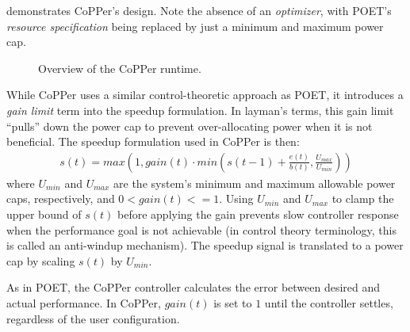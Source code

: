  demonstrates CoPPer's design.
Note the absence of an \emph{optimizer}, with POET's \emph{resource specification} being replaced by just a minimum and maximum power cap.

\begin{figure}[t]
  \begin{centering}
    
    \caption{Overview of the CoPPer runtime.}
    \label{fig:copper-runtime}
  \end{centering}
\end{figure}

While CoPPer uses a similar control-theoretic approach as POET, it introduces a \emph{gain limit} term into the speedup formulation.
In layman's terms, this gain limit ``pulls'' down the power cap to prevent over-allocating power when it is not beneficial.
The speedup formulation used in CoPPer is then:
\begin{eqnarray}
  s(t) = max\left(1, gain(t) \cdot min\left(s(t-1) + \frac{e(t)}{b(t)}, \frac{U_{max}}{U_{min}}\right)\right)
  \label{eqn:copper-speedup-control}
\end{eqnarray}
where $U_{min}$ and $U_{max}$ are the system's minimum and maximum allowable power caps, respectively, and $0 < gain(t) <= 1$.
Using $U_{min}$ and $U_{max}$ to clamp the upper bound of $s(t)$ before applying the gain prevents slow controller response when the performance goal is not achievable (in control theory terminology, this is called an anti-windup mechanism).
The speedup signal is translated to a power cap by scaling $s(t)$ by $U_{min}$.

As in POET, the CoPPer controller calculates the error between desired and actual performance.
In CoPPer, $gain(t)$ is set to $1$ until the controller settles, regardless of the user configuration.

